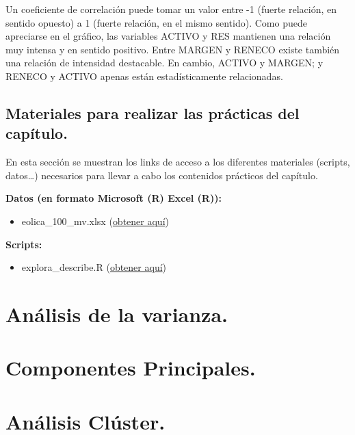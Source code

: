 \documentclass[
]{book}
\providecommand{\tightlist}{%
  \setlength{\itemsep}{0pt}\setlength{\parskip}{0pt}}
\begin{document}
Un coeficiente de correlación puede tomar un valor entre -1 (fuerte relación, en sentido opuesto) a 1 (fuerte relación, en el mismo sentido). Como puede apreciarse en el gráfico, las variables ACTIVO y RES mantienen una relación muy intensa y en sentido positivo. Entre MARGEN y RENECO existe también una relación de intensidad destacable. En cambio, ACTIVO y MARGEN; y RENECO y ACTIVO apenas están estadísticamente relacionadas.

\section{Materiales para realizar las prácticas del capítulo.}\label{materiales-para-realizar-las-pruxe1cticas-del-capuxedtulo.-3}

En esta sección se muestran los links de acceso a los diferentes materiales (scripts, datos\ldots) necesarios para llevar a cabo los contenidos prácticos del capítulo.

\textbf{Datos (en formato Microsoft (R) Excel (R)):}

\begin{itemize}
\tightlist
\item
  eolica\_100\_mv.xlsx (\href{https://docs.google.com/spreadsheets/d/1kgJaXiowfrHy77bKaLxUBuQWfmCcoydU/edit?usp=drive_link&ouid=115375878280465826079&rtpof=true&sd=true}{obtener aquí})
\end{itemize}

\textbf{Scripts:}

\begin{itemize}
\tightlist
\item
  explora\_describe.R (\href{https://drive.google.com/file/d/1eBcJnXpEi-9V6DxbXN7tSToJpGLH2xlB/view?usp=drive_link}{obtener aquí})
\end{itemize}

\chapter{Análisis de la varianza.}\label{anuxe1lisis-de-la-varianza.}

\chapter{Componentes Principales.}\label{componentes-principales.}

\chapter{Análisis Clúster.}\label{anuxe1lisis-cluxfaster.}
\end{document}

